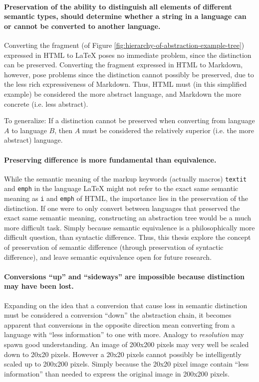 \documentclass{scrreprt}
\begin{document}
\paragraph{Preservation of the ability to distinguish all elements of different semantic types, should determine whether a string in a language can or cannot be converted to another language.}

Converting the fragment (of Figure \ref{fig:hierarchy-of-abstraction-example-tree}) expressed in HTML to \LaTeX{} poses no immediate problem, since the distinction can be preserved. Converting the fragment expressed in HTML to Markdown, however, pose problems since the distinction cannot possibly be preserved, due to the less rich expressiveness of Markdown. Thus, HTML must (in this simplified example) be considered the more abstract language, and Markdown the more concrete (i.e. less abstract).

To generalize: If a distinction cannot be preserved when converting from language $A$ to language $B$, then $A$ must be considered the relatively superior (i.e. the more abstract) language.

\paragraph{Preserving difference is more fundamental than equivalence.} While the semantic meaning of the markup keywords (actually macros) \texttt{textit} and \texttt{emph} in the language \LaTeX{} might not refer to the exact same semantic meaning as \texttt{i} and \texttt{emph} of HTML, the importance lies in the preservation of the distinction. If one were to only convert between languages that preserved the exact same semantic meaning, constructing an abstraction tree would be a much more difficult task. Simply because semantic equivalence is a philosophically more difficult question, than syntactic difference. Thus, this thesis explore the concept of preservation of semantic difference (through preservation of syntactic difference), and leave semantic equivalence open for future research.
\label{sec:difference-is-more-important-than-equivalence}


\paragraph{Conversions ``up'' and ``sideways'' are impossible because distinction may have been lost.} Expanding on the idea that a conversion that cause loss in semantic distinction must be considered a conversion ``down'' the abstraction chain, it becomes apparent that conversions in the opposite direction mean converting from a language with ``less information'' to one with more. Analogy to \emph{resolution} may spawn good understanding. An image of 200x200 pixels may very well be scaled down to 20x20 pixels. However a 20x20 pixels cannot possibly be intelligently scaled up to 200x200 pixels. Simply because the 20x20 pixel image contain ``less information'' than needed to express the original image in 200x200 pixels.
\end{document}
